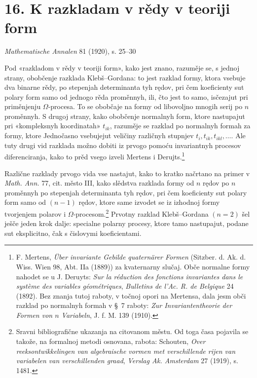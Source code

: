 \documentclass[11pt]{article}
\begin{document}

\section*{16. K razkladam v rědy v teoriji form}
\begin{center}
\emph{Mathematische Annalen} 81 (1920), s. 25--30
\end{center}

Pod «razkladom v rědy v teoriji form», kako jest znano, razuměje se, s jednoj strany, obobčenje razklada Klebš--Gordana: to jest razklad formy, ktora vsebuje dva binarne rědy, po stepenjah determinanta tyh rędov, pri čem koeficienty sut polary form samo od jednogo rěda proměnnyh, ili, čto jest to samo, isčezajut pri priměnjenju \(\Omega\)-procesa. To se obobčaje na formy od libovoljno mnogih serij po \(n\) proměnnyh. S drugoj strany, kako obobčenje normalnyh form, ktore nastupajut pri «kompleksnyh koordinatah» \(t_{ik}\), razuměje se razklad po normalnyh formah za formy, ktore Jednočasno vsebujejut veličiny različnyh stupnjev \(t_i,t_{ik},t_{ikl},\ldots\). Ale tuty drugi vid razklada možno dobiti iz prvogo pomoću invariantnyh procesov diferenciranja, kako to prěd vsego izveli Mertens i Derujts.\footnote{F. Mertens, \emph{Über invariante Gebilde quaternärer Formen} (Sitzber. d. Ak. d. Wiss. Wien 98, Abt. IIa (1889)) za kvaternarny slučaj. Obče normalne formy nahodet se u J. Deruyts: \emph{Sur la réduction des fonctions invariantes dans le système des variables géométriques}, \emph{Bulletins de l'Ac. R. de Belgique} 24 (1892). Bez znanja tutoj raboty, v točnoj opori na Mertensa, dala jesm obči razklad po normalnyh formah v \S~7 raboty: \emph{Zur Invariantentheorie der Formen von \(n\) Variabeln}, J. f. M. 139 (1910).}

Različne razklady prvogo vida vse nastajut, kako to kratko načrtano na primer v \emph{Math. Ann.} 77, cit. město III, kako slědstva razklada formy od \(n\) rędov po \(n\) proměnnyh po stepenjah determinanta tyh rędov, pri čem koeficienty sut polary form samo od \((n-1)\) rędov, ktore same izvodet se iz izhodnoj formy tvorjenjem polarov i \(\Omega\)-procesom.\footnote{Sravni bibliografične ukazanja na citovanom městu. Od toga časa pojavila se takože, na formalnoj metodi osnovana, rabota: Schouten, \emph{Over reeksontwikkelingen van algebraische vormen met verschillende rijen van variabelen van verschillenden graad}, \emph{Verslag Ak. Amsterdam} 27 (1919), s. 1481.} Prvotny razklad Klebš--Gordana \((n=2)\) šel ješče jeden krok dalje: specialne polarny procesy, ktore tamo nastupajut, podane sut eksplicitno, čak s čislovymi koeficientami.
\end{document}
